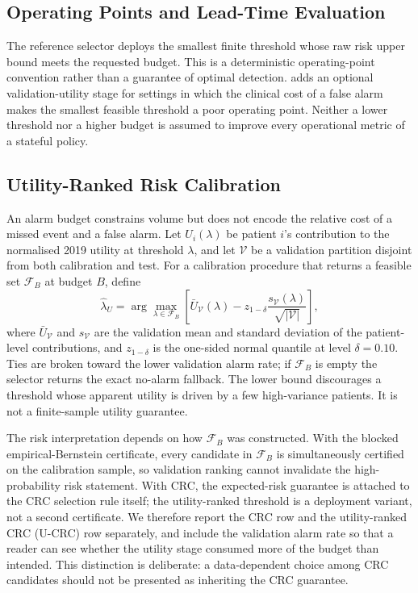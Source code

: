 \subsection{Operating Points and Lead-Time Evaluation}

The reference selector deploys the smallest finite threshold whose raw risk upper bound meets the requested budget. This is a deterministic operating-point convention rather than a guarantee of optimal detection.  adds an optional validation-utility stage for settings in which the clinical cost of a false alarm makes the smallest feasible threshold a poor operating point. Neither a lower threshold nor a higher budget is assumed to improve every operational metric of a stateful policy.

\subsection{Utility-Ranked Risk Calibration}
\label{sec:utility-selector}

An alarm budget constrains volume but does not encode the relative cost of a missed event and a false alarm. Let $U_i(\lambda)$ be patient $i$'s contribution to the normalised 2019 utility at threshold $\lambda$, and let $\mathcal V$ be a validation partition disjoint from both calibration and test. For a calibration procedure that returns a feasible set $\mathcal F_B$ at budget $B$, define
\begin{equation}
\label{eq:utility-select}
\widehat\lambda_U=\arg\max_{\lambda\in\mathcal F_B}
\left[\bar U_{\mathcal V}(\lambda)-z_{1-\delta}
\frac{s_{\mathcal V}(\lambda)}{\sqrt{|\mathcal V|}}\right],
\end{equation}
where $\bar U_{\mathcal V}$ and $s_{\mathcal V}$ are the validation mean and standard deviation of the patient-level contributions, and $z_{1-\delta}$ is the one-sided normal quantile at level $\delta=0.10$. Ties are broken toward the lower validation alarm rate; if $\mathcal F_B$ is empty the selector returns the exact no-alarm fallback. The lower bound discourages a threshold whose apparent utility is driven by a few high-variance patients. It is not a finite-sample utility guarantee.

The risk interpretation depends on how $\mathcal F_B$ was constructed. With the blocked empirical-Bernstein certificate, every candidate in $\mathcal F_B$ is simultaneously certified on the calibration sample, so validation ranking cannot invalidate the high-probability risk statement. With CRC, the expected-risk guarantee is attached to the CRC selection rule itself; the utility-ranked threshold is a deployment variant, not a second certificate. We therefore report the CRC row and the utility-ranked CRC (U-CRC) row separately, and include the validation alarm rate so that a reader can see whether the utility stage consumed more of the budget than intended. This distinction is deliberate: a data-dependent choice among CRC candidates should not be presented as inheriting the CRC guarantee.

